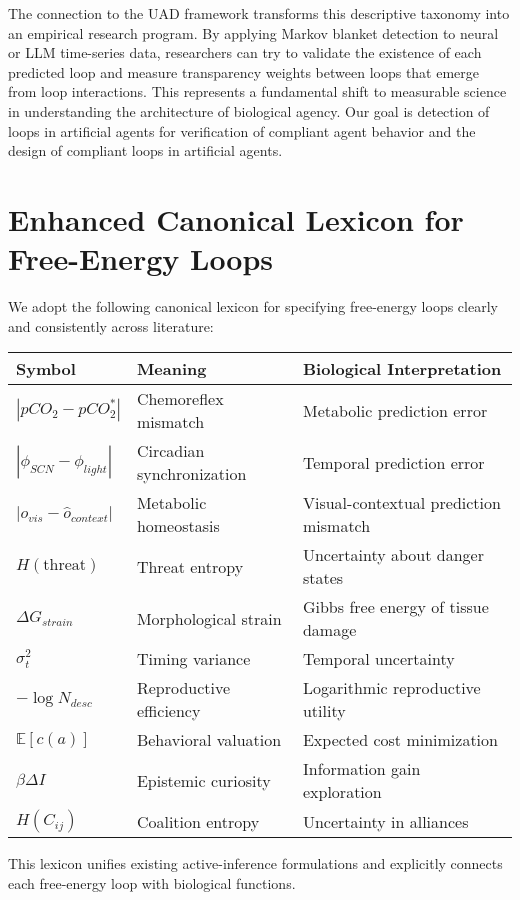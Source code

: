 \documentclass[10pt]{article}
\begin{document}
The connection to the UAD framework transforms this descriptive taxonomy into an empirical research program. By applying Markov blanket detection to neural or LLM time-series data, researchers can try to validate the existence of each predicted loop and measure transparency weights between loops that emerge from loop interactions. 
This represents a fundamental shift to measurable science in understanding the architecture of biological agency.
Our goal is detection of loops in artificial agents for verification of compliant agent behavior and the design of compliant loops in artificial agents.

\section{Enhanced Canonical Lexicon for Free-Energy Loops}
We adopt the following canonical lexicon for specifying free-energy loops clearly and consistently across literature:

\begin{tabular}{lll}
\textbf{Symbol} & \textbf{Meaning} & \textbf{Biological Interpretation} \\
\hline
$|pCO_2 - pCO_2^*|$ & Chemoreflex mismatch & Metabolic prediction error \\
$|\phi_{SCN} - \phi_{light}|$ & Circadian synchronization & Temporal prediction error \\
$|o_{vis} - \hat{o}_{context}|$ & Metabolic homeostasis & Visual-contextual prediction mismatch \\
$H(\text{threat})$ & Threat entropy & Uncertainty about danger states \\
$\Delta G_{strain}$ & Morphological strain & Gibbs free energy of tissue damage \\
$\sigma^2_t$ & Timing variance & Temporal uncertainty \\
$-\log N_{desc}$ & Reproductive efficiency & Logarithmic reproductive utility \\
$\mathbb{E}[c(a)]$ & Behavioral valuation & Expected cost minimization \\
$\beta \Delta I$ & Epistemic curiosity & Information gain exploration \\
$H(C_{ij})$ & Coalition entropy & Uncertainty in alliances \\
\hline
\end{tabular}

This lexicon unifies existing active-inference formulations \cite{ramstead2022bayesian} and explicitly connects each free-energy loop with biological functions.



\end{document}
